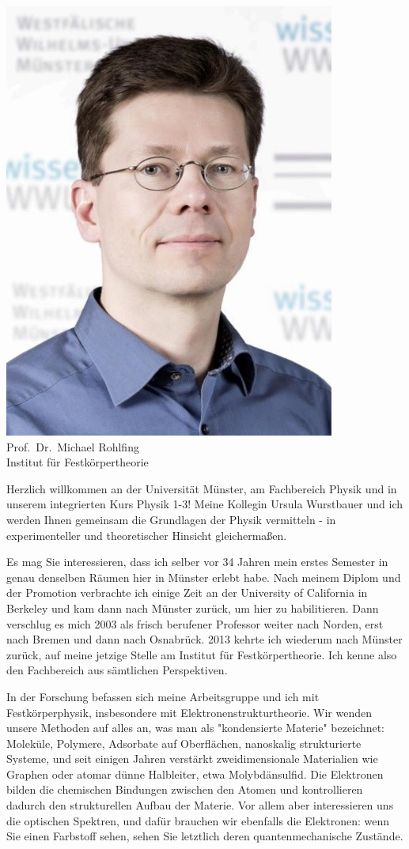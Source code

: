 \begin{multicols}{2}
\begin{center}
\includegraphics[width=0.71\columnwidth]{res/vorstellungsfotos/rohlfing.jpg}\\
Prof.\ Dr.\ Michael Rohlfing\\
Institut für Festkörpertheorie
\end{center}

Herzlich willkommen an der Universität Münster, am Fachbereich Physik und in unserem integrierten Kurs Physik 1-3! Meine Kollegin Ursula Wurstbauer und ich werden Ihnen gemeinsam die Grundlagen der Physik vermitteln - in experimenteller und theoretischer Hinsicht gleichermaßen.

Es mag Sie interessieren, dass ich selber vor 34 Jahren mein erstes Semester in genau denselben Räumen hier in Münster erlebt habe. Nach meinem Diplom und der Promotion verbrachte ich einige Zeit an der University of California in Berkeley und kam dann nach Münster zurück, um hier zu habilitieren. Dann verschlug es mich 2003 als frisch berufener Professor weiter nach Norden, erst nach Bremen und dann nach Osnabrück. 2013 kehrte ich wiederum nach Münster zurück, auf meine jetzige Stelle am Institut für Festkörpertheorie. Ich kenne also den Fachbereich aus sämtlichen Perspektiven.

In der Forschung befassen sich meine Arbeitsgruppe und ich mit Festkörperphysik, insbesondere mit Elektronenstrukturtheorie. Wir wenden unsere Methoden auf alles an, was man als "kondensierte Materie" bezeichnet: Moleküle, Polymere, Adsorbate auf Oberflächen, nanoskalig strukturierte Systeme, und seit einigen Jahren verstärkt zweidimensionale Materialien wie Graphen oder atomar dünne Halbleiter, etwa Molybdänsulfid. Die Elektronen bilden die chemischen Bindungen zwischen den Atomen und kontrollieren dadurch den strukturellen Aufbau der Materie. Vor allem aber interessieren uns die optischen Spektren, und dafür brauchen wir ebenfalls die Elektronen: wenn Sie einen Farbstoff sehen, sehen Sie letztlich deren quantenmechanische Zustände.


\end{multicols}
